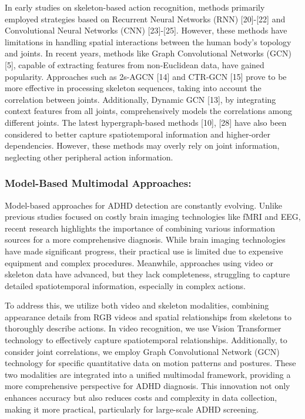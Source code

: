 \documentclass[conference,a4paper,english]{IEEEtran}[2015/08/26]
\begin{document}
In early studies on skeleton-based action recognition, 
methods primarily employed strategies based on Recurrent Neural Networks (RNN) [20]-[22] and 
Convolutional Neural Networks (CNN) [23]-[25]. However, these methods have limitations 
in handling spatial interactions between the human body's topology and joints. 
In recent years, methods like Graph Convolutional Networks (GCN) [5], 
capable of extracting features from non-Euclidean data, have gained popularity. 
Approaches such as 2s-AGCN [14] and CTR-GCN [15] prove to be more effective in processing skeleton 
sequences, taking into account the correlation between joints. Additionally, Dynamic GCN [13], 
by integrating context features from all joints,
 comprehensively models the correlations among different joints. The latest hypergraph-based methods [10],
  [28] have also been considered to better capture 
  spatiotemporal information and higher-order dependencies. However, 
  these methods may overly rely on joint information,
 neglecting other peripheral action information.
\subsubsection{Model-Based Multimodal Approaches:}


Model-based approaches for ADHD detection are constantly evolving. 
Unlike previous studies focused on costly brain imaging technologies like fMRI and EEG, 
recent research highlights the importance of combining various information sources for a more 
comprehensive diagnosis. While brain imaging technologies have made significant progress, 
their practical use is limited due to expensive equipment and complex procedures. Meanwhile, 
approaches using video or skeleton data have advanced, but they lack completeness, 
struggling to capture detailed spatiotemporal information, especially in complex actions.

To address this, we utilize both video and skeleton modalities, 
combining appearance details from RGB videos and spatial relationships from skeletons to thoroughly 
describe actions. In video recognition, we use Vision Transformer technology to effectively capture 
spatiotemporal relationships. Additionally, to consider joint correlations, 
we employ Graph Convolutional Network (GCN) technology for specific quantitative data on 
motion patterns and postures. These two modalities are integrated into a unified multimodal 
framework, providing a more comprehensive perspective for ADHD diagnosis. 
This innovation not only enhances accuracy but also reduces costs and complexity in data collection,
making it more practical, particularly for large-scale ADHD screening.
\end{document}
